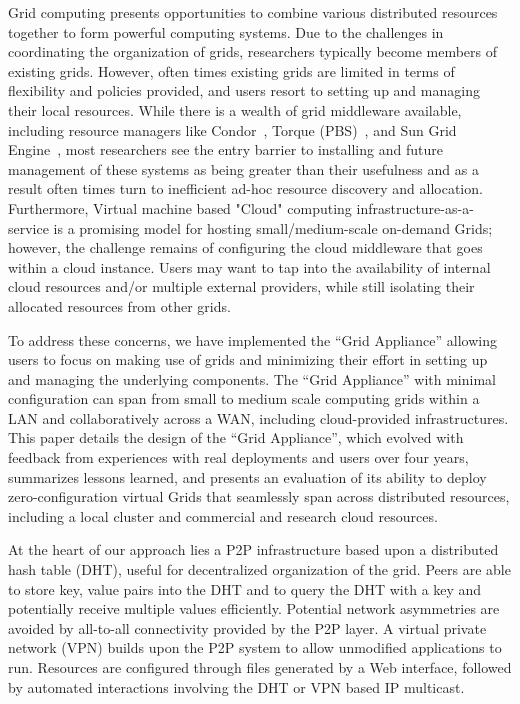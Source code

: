 \documentclass[conference]{IEEEtran}
\begin{document}
Grid computing presents opportunities to combine various distributed resources
together to form powerful computing systems.  Due to the challenges in
coordinating the organization of grids, researchers typically become members of
existing grids. However, often times existing grids are limited in terms of
flexibility and policies provided, and users resort to setting up and managing
their local resources.  While there is a wealth of grid middleware available,
including resource managers like Condor~\cite{condor0}, Torque
(PBS)~\cite{torque}, and Sun Grid Engine~\cite{grid_engine}, most researchers
see the entry barrier to installing and future management of these systems as
being greater than their usefulness and as a result often times turn to
inefficient ad-hoc resource discovery and allocation.  Furthermore, Virtual
machine based "Cloud" computing infrastructure-as-a-service is a promising
model for hosting small/medium-scale on-demand Grids; however, the challenge
remains of configuring the cloud middleware that goes within a cloud instance.
Users may want to tap into the availability of internal cloud resources and/or
multiple external providers, while still isolating their allocated resources
from other grids.

To address these concerns, we have implemented the ``Grid Appliance'' allowing
users to focus on making use of grids and minimizing their effort in setting up
and managing the underlying components.  The ``Grid Appliance'' with minimal
configuration can span from small to medium scale computing grids within a LAN
and collaboratively across a WAN, including cloud-provided infrastructures.
This paper details the design of the ``Grid Appliance'', which evolved with
feedback from experiences with real deployments and users over four years,
summarizes lessons learned, and presents an evaluation of its ability to deploy
zero-configuration virtual Grids that seamlessly span across distributed
resources, including a local cluster and commercial and research cloud
resources.

At the heart of our approach lies a P2P infrastructure based upon a distributed
hash table (DHT), useful for decentralized organization of the grid.  Peers are
able to store key, value pairs into the DHT and to query the DHT with a key and
potentially receive multiple values efficiently.  Potential network asymmetries
are avoided by all-to-all connectivity provided by the P2P layer.  A virtual
private network (VPN) builds upon the P2P system to allow unmodified
applications to run.  Resources are configured through files generated by a Web
interface, followed by automated interactions involving the DHT or VPN based IP
multicast.  
\end{document}

